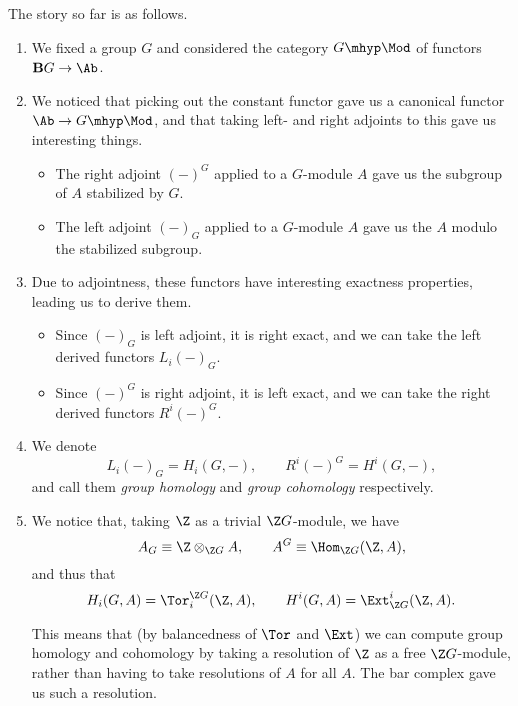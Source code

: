 \documentclass[main.tex]{subfiles}
\begin{document}
The story so far is as follows.
\begin{enumerate}
  \item We fixed a group $G$ and considered the category $G\mhyp\Mod$ of functors $\mathbf{B}G \to \Ab$.

  \item We noticed that picking out the constant functor gave us a canonical functor $\Ab \to G\mhyp\Mod$, and that taking left- and right adjoints to this gave us interesting things.
    \begin{itemize}
      \item The right adjoint $(-)^{G}$ applied to a $G$-module $A$ gave us the subgroup of $A$ stabilized by $G$.

      \item The left adjoint $(-)_{G}$ applied to a $G$-module $A$ gave us the $A$ modulo the stabilized subgroup.
    \end{itemize}

  \item Due to adjointness, these functors have interesting exactness properties, leading us to derive them.
    \begin{itemize}
      \item Since $(-)_{G}$ is left adjoint, it is right exact, and we can take the left derived functors $L_{i}(-)_{G}$.

      \item Since $(-)^{G}$ is right adjoint, it is left exact, and we can take the right derived functors $R^{i}(-)^{G}$.
    \end{itemize}

  \item We denote
    \begin{equation*}
      L_{i}(-)_{G} = H_{i}(G, -),\qquad R^{i}(-)^{G} = H^{i}(G, -),
    \end{equation*}
    and call them \emph{group homology} and \emph{group cohomology} respectively.

  \item We notice that, taking $\Z$ as a trivial $\Z G$-module, we have
    \begin{equation*}
      A_{G} \equiv \Z \otimes_{\Z G} A,\qquad A^{G} \equiv \Hom_{\Z G}(\Z, A),
    \end{equation*}
    and thus that
    \begin{equation*}
      H_{i}(G, A) = \Tor^{\Z G}_{i}(\Z, A),\qquad H^{i}(G, A) = \Ext_{\Z G}^{i}(\Z, A).
    \end{equation*}

    This means that (by balancedness of $\Tor$ and $\Ext$) we can compute group homology and cohomology by taking a resolution of $\Z$ as a free $\Z G$-module, rather than having to take resolutions of $A$ for all $A$. The bar complex gave us such a resolution.
\end{enumerate}
\end{document}
